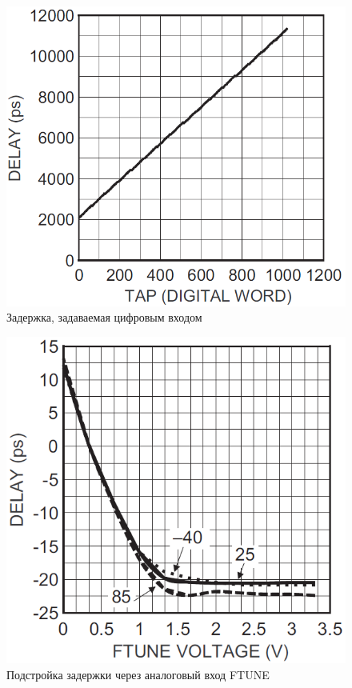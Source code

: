 \begin{figure}[ht!] 
	\center
	\includegraphics [scale=0.6] {my_folder/images//dline_code}
	\caption{Задержка, задаваемая цифровым входом} 
	\label{fig:dline-code}  
\end{figure}

\begin{figure}[ht!] 
	\center
	\includegraphics [scale=0.6] {my_folder/images//dline_ftune}
	\caption{Подстройка задержки через аналоговый вход FTUNE} 
	\label{fig:dline-ftune}  
\end{figure}


